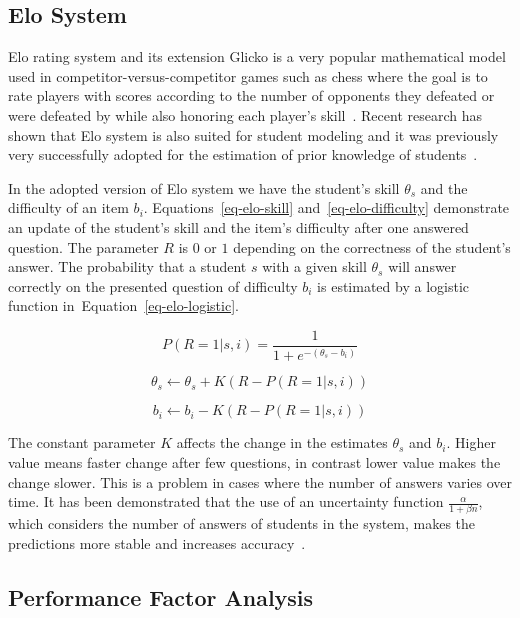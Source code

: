 \subsection{Elo System}
\label{elo}

Elo rating system and its extension Glicko is a very popular mathematical model used in competitor-versus-competitor games such as chess where the goal is to rate players with scores according to the number of opponents they defeated or were defeated by while also honoring each player's skill~\cite{Vanek2014}. Recent research has shown that Elo system is also suited for student modeling and it was previously very successfully adopted for the estimation of prior knowledge of students~\cite{Niznan2015}.

In the adopted version of Elo system we have the student's skill $\theta_s$ and the difficulty of an item $b_i$. Equations~\ref{eq-elo-skill} and~\ref{eq-elo-difficulty} demonstrate an update of the student's skill and the item's difficulty after one answered question. The parameter $R$ is $0$ or $1$ depending on the correctness of the student's answer. The probability that a student $s$ with a given skill $\theta_s$ will answer correctly on the presented question of difficulty $b_i$ is estimated by a logistic function in~Equation~\ref{eq-elo-logistic}.

\begin{equation} \label{eq-elo-logistic}
  P(R = 1|s,i) = \frac{1}{1 + e^{-(\theta_s - b_i)}}
\end{equation}

\begin{equation} \label{eq-elo-skill}
  \theta_s \gets \theta_s + K(R - P(R = 1|s,i))
\end{equation}

\begin{equation} \label{eq-elo-difficulty}
  b_i \gets b_i - K(R - P(R = 1|s,i))
\end{equation}

The constant parameter $K$ affects the change in the estimates $\theta_s$ and $b_i$. Higher value means faster change after few questions, in contrast lower value makes the change slower. This is a problem in cases where the number of answers varies over time. It has been demonstrated that the use of an uncertainty function $\frac{\alpha}{1 + \beta n}$, which considers the number of answers of students in the system, makes the predictions more stable and increases accuracy~\cite{Vanek2014}.

\subsection{Performance Factor Analysis}
\label{pfa}

